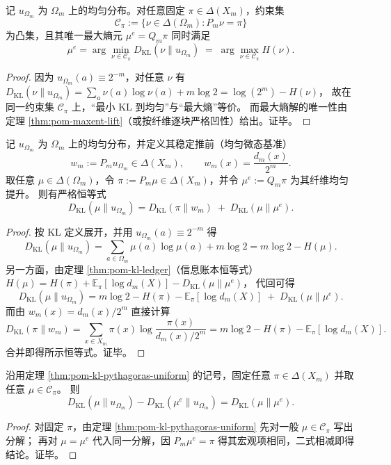 \begin{corollary}\label{cor:pom-Iproj-maxent}
记 $u_{\Omega_m}$ 为 $\Omega_m$ 上的均匀分布。对任意固定 $\pi\in\Delta(X_m)$，约束集
\[
\mathcal{C}_\pi:=\{\nu\in\Delta(\Omega_m):P_m\nu=\pi\}
\]
为凸集，且其唯一最大熵元 $\mu^e=Q_m\pi$ 同时满足
\[
\boxed{\;
\mu^e=\arg\min_{\nu\in\mathcal{C}_\pi}D_{\mathrm{KL}}(\nu\|u_{\Omega_m})
\;=\;
\arg\max_{\nu\in\mathcal{C}_\pi}H(\nu).
\;}
\]
\end{corollary}
\begin{proof}
因为 $u_{\Omega_m}(a)\equiv 2^{-m}$，对任意 $\nu$ 有
\(
D_{\mathrm{KL}}(\nu\|u_{\Omega_m})=\sum_a \nu(a)\log\nu(a)+m\log 2=\log(2^m)-H(\nu)
\)，
故在同一约束集 $\mathcal{C}_\pi$ 上，“最小 KL 到均匀”与“最大熵”等价。
而最大熵解的唯一性由定理 \ref{thm:pom-maxent-lift}（或按纤维逐块严格凹性）给出。证毕。
\end{proof}

\begin{theorem}\label{thm:pom-kl-pythagoras-uniform}
记 $u_{\Omega_m}$ 为 $\Omega_m$ 上的均匀分布，并定义其稳定推前（均匀微态基准）
\[
w_m:=P_m u_{\Omega_m}\in\Delta(X_m),\qquad
w_m(x)=\frac{d_m(x)}{2^m}.
\]
取任意 $\mu\in\Delta(\Omega_m)$，令 $\pi:=P_m\mu\in\Delta(X_m)$，并令 $\mu^e:=Q_m\pi$ 为其纤维均匀提升。
则有严格恒等式
\[
\boxed{\;
D_{\mathrm{KL}}(\mu\|u_{\Omega_m})
=D_{\mathrm{KL}}(\pi\|w_m)\;+\;D_{\mathrm{KL}}(\mu\|\mu^e).
\;}
\]
\end{theorem}
\begin{proof}
按 KL 定义展开，并用 $u_{\Omega_m}(a)\equiv 2^{-m}$ 得
\[
D_{\mathrm{KL}}(\mu\|u_{\Omega_m})
=\sum_{a\in\Omega_m}\mu(a)\log\mu(a)+m\log 2
=m\log 2-H(\mu).
\]
另一方面，由定理 \ref{thm:pom-kl-ledger}（信息账本恒等式）
\(
H(\mu)=H(\pi)+\mathbb{E}_\pi[\log d_m(X)]-D_{\mathrm{KL}}(\mu\|\mu^e)
\)，
代回可得
\[
D_{\mathrm{KL}}(\mu\|u_{\Omega_m})
=m\log 2-H(\pi)-\mathbb{E}_\pi[\log d_m(X)]\;+\;D_{\mathrm{KL}}(\mu\|\mu^e).
\]
而由 $w_m(x)=d_m(x)/2^m$ 直接计算
\[
D_{\mathrm{KL}}(\pi\|w_m)
=\sum_{x\in X_m}\pi(x)\log\frac{\pi(x)}{d_m(x)/2^m}
=m\log 2-H(\pi)-\mathbb{E}_\pi[\log d_m(X)].
\]
合并即得所示恒等式。证毕。
\end{proof}

\begin{corollary}\label{cor:pom-Iproj-gap-exact}
沿用定理 \ref{thm:pom-kl-pythagoras-uniform} 的记号，固定任意 $\pi\in\Delta(X_m)$ 并取任意 $\mu\in\mathcal{C}_\pi$。
则
\[
\boxed{\;
D_{\mathrm{KL}}(\mu\|u_{\Omega_m})-D_{\mathrm{KL}}(\mu^e\|u_{\Omega_m})
=D_{\mathrm{KL}}(\mu\|\mu^e).
\;}
\]
\end{corollary}
\begin{proof}
对固定 $\pi$，由定理 \ref{thm:pom-kl-pythagoras-uniform} 先对一般 $\mu\in\mathcal{C}_\pi$ 写出分解；
再对 $\mu=\mu^e$ 代入同一分解，因 $P_m\mu^e=\pi$ 得其宏观项相同，二式相减即得结论。证毕。
\end{proof}

